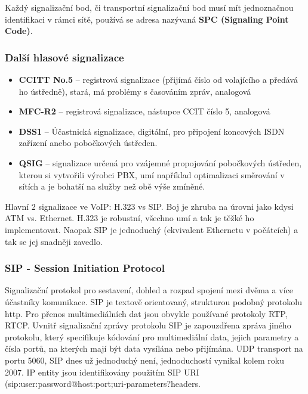 \noindent Každý signalizační bod, či transportní signalizační bod musí mít jednoznačnou identifikaci v rámci sítě, používá se adresa nazývaná \textbf{SPC (Signaling Point Code)}.

\subsubsection{Další hlasové signalizace}
\begin{itemize}
\item \textbf{CCITT No.5} -- registrová signalizace (přijímá číslo od volajícího a předává ho ústředně), stará, má problémy s časováním zpráv, analogová
\item \textbf{MFC-R2} -- registrová signalizace, nástupce CCIT číslo 5, analogová
\item \textbf{DSS1} -- Účastnická signalizace, digitální, pro připojení koncových ISDN zařízení anebo pobočkových ústředen.
\item \textbf{QSIG} -- signalizace určená pro vzájemné propojování pobočkových ústředen, kterou si vytvořili výrobci PBX, umí například optimalizaci směrování v sítích a je bohatší na služby než obě výše zmíněné.
\end{itemize}

Hlavní 2 signalizace ve VoIP: H.323 vs SIP. Boj je zhruba na úrovni jako kdysi ATM vs. Ethernet. H.323 je robustní, všechno umí a tak je těžké ho implementovat. Naopak SIP je jednoduchý (ekvivalent Ethernetu v počátcích) a tak se jej snadněji zavedlo.

\subsubsection{SIP - Session Initiation Protocol}
Signalizační protokol pro sestavení, dohled a rozpad spojení mezi dvěma a více účastníky komunikace. SIP je textově orientovaný, strukturou podobný protokolu http.
Pro přenos multimediálních dat jsou obvykle používané protokoly RTP, RTCP.
Uvnitř signalizační zprávy protokolu SIP je zapouzdřena zpráva jiného protokolu, který specifikuje kódování pro multimediální data, jejich parametry a čísla portů, na kterých mají být data vysílána nebo přijímána. UDP transport na portu 5060, SIP dnes už jednoduchý není, jednoduchostí vynikal kolem roku 2007.
IP entity jsou identifikovány použitím SIP URI (sip:user:password@host:port;uri-parameters?headers.

